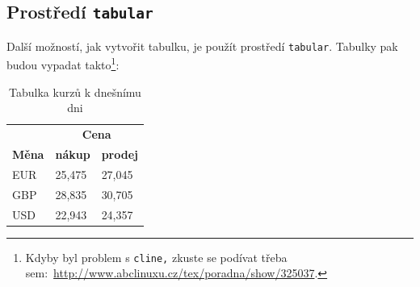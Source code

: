 \documentclass[a4paper, 11pt, hidelinks]{article}
\begin{document}
\subsection{Prostředí \texttt{tabular}}
Další možností, jak vytvořit tabulku, je použít prostředí \texttt{tabular}. Tabulky pak budou vypadat takto\footnote{Kdyby byl problem s \texttt{cline,} zkuste se podívat třeba sem:~\url{http://www.abclinuxu.cz/tex/poradna/show/325037}.}:
\medskip
\begin{table}[h]
\centering
\begin{tabular}{|l|l|l|}
\hline
              & \multicolumn{2}{c|}{\textbf{Cena}}                                         \\ \cline{2-3} 
\textbf{Měna} & \multicolumn{1}{c|}{\textbf{nákup}} & \multicolumn{1}{c|}{\textbf{prodej}} \\ \hline
EUR           & 25,475                              & 27,045                               \\
GBP           & 28,835                              & 30,705                               \\
USD           & 22,943                              & 24,357                               \\ \hline
\end{tabular}
\caption{Tabulka kurzů k dnešnímu dni}
\label{tabulka1}
\end{table}
\medskip
\end{document}
